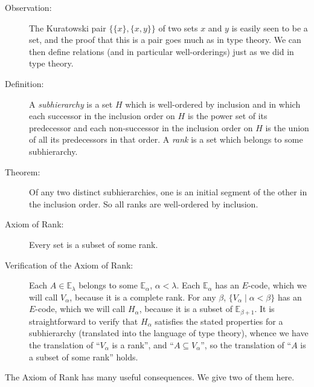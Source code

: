 \documentclass[12pt]{book}
\begin{document}
\begin{description}

\item[Observation:] The Kuratowski pair $\{\{x\},\{x,y\}\}$ of two
sets $x$ and $y$ is easily seen to be a set, and the proof that this
is a pair goes much as in type theory.  We can then define relations
(and in particular well-orderings) just as we did in type theory.

\item[Definition:] A {\em subhierarchy\/} is a set $H$ which is
well-ordered by inclusion and in which each successor in the inclusion
order on $H$ is the power set of its predecessor and each non-successor in the
inclusion order on $H$ is the union of all its predecessors in that
order.  A {\em rank\/} is a set which belongs to some subhierarchy.

\item[Theorem:] Of any two distinct subhierarchies, one is an initial
segment of the other in the inclusion order.  So all ranks are
well-ordered by inclusion.

\item[Axiom of Rank:]  Every set is a subset of some rank.

\item[Verification of the Axiom of Rank:] Each $A \in {\mathbb
E}_{\lambda}$ belongs to some ${\mathbb E}_{\alpha}$,
$\alpha<\lambda$.  Each ${\mathbb E}_{\alpha}$ has an $E$-code, which
we will call $V_{\alpha}$, because it is a complete rank.  For any
$\beta$, $\{V_{\alpha} \mid \alpha<\beta\}$ has an $E$-code, which we
will call $H_{\alpha}$, because it is a subset of ${\mathbb
E}_{\beta+1}$.  It is straightforward to verify that $H_{\alpha}$
satisfies the stated properties for a subhierarchy (translated into the
language of type theory), whence we have the translation of
``$V_{\alpha}$ is a rank'', and ``$A \subseteq V_{\alpha}$'', so the
translation of ``$A$ is a subset of some rank'' holds.

\end{description}

The Axiom of Rank has many useful consequences.  We give two of them
here.
\end{document}
